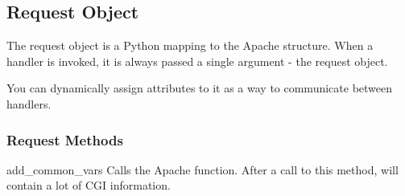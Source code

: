 \subsection{Request Object\label{pyapi-mprequest}}

The request object is a Python mapping to the Apache
 structure. When a handler is invoked, it is always
passed a single argument - the request object. 

You can dynamically assign attributes to it as a way to communicate
between handlers.

\subsubsection{Request Methods\label{pyapi-mprequest-meth}}

\begin{methoddesc}[request]{add_common_vars}{}
  Calls the Apache  function. After a
  call to this method,  will contain a
  lot of CGI information.
\end{methoddesc}

